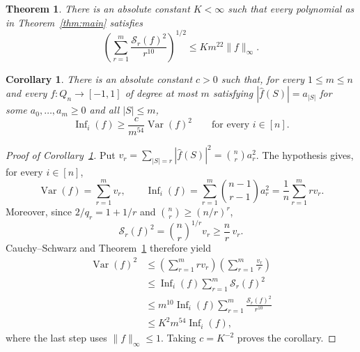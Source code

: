\documentclass[10pt,a4paper]{amsart}
\newtheorem{theorem}{Theorem}
\newtheorem{corollary}{Corollary}
\begin{document}
\begin{theorem}\label{thm:weighted}
There is an absolute constant $K<\infty$ such that every polynomial as in
Theorem~\ref{thm:main} satisfies
\begin{equation}\label{eq:weighted-intro}
\left(\sum_{r=1}^m\frac{\mathcal{S}_{r}(f)^2}{r^{10}}\right)^{1/2}
\le Km^{22}\|f\|_\infty.
\end{equation}
\end{theorem}

\begin{corollary}\label{cor:AA}
There is an absolute constant $c>0$ such that, for every $1\le m\le n$
and every $f:Q_n\to[-1,1]$ of degree at most $m$ satisfying
$|\widehat f(S)|=a_{|S|}$ for some $a_0,\ldots,a_m\ge0$ and all $|S|\le m$,
\[
\operatorname{Inf}_i(f)\ge
\frac{c}{m^{54}}\operatorname{Var}(f)^2
\qquad\text{for every }i\in[n].
\]
\end{corollary}

\begin{proof}[Proof of Corollary~\ref{cor:AA}]
Put $v_r=\sum_{|S|=r}|\widehat f(S)|^2=\binom nr a_r^2$. The hypothesis
gives, for every $i\in[n]$,
\[
\operatorname{Var}(f)=\sum_{r=1}^m v_r,
\qquad
\operatorname{Inf}_i(f)=\sum_{r=1}^m\binom{n-1}{r-1}a_r^2
=\frac1n\sum_{r=1}^m rv_r.
\]
Moreover, since $2/q_r=1+1/r$ and $\binom nr\ge(n/r)^r$,
\[
\mathcal{S}_r(f)^2=\binom nr^{1/r}v_r\ge\frac nr\,v_r.
\]
Cauchy--Schwarz and Theorem~\ref{thm:weighted} therefore yield
\begin{align*}
\operatorname{Var}(f)^2
&\le\left(\sum_{r=1}^m rv_r\right)
       \left(\sum_{r=1}^m\frac{v_r}{r}\right)\\
&\le\operatorname{Inf}_i(f)\sum_{r=1}^m\mathcal{S}_r(f)^2\\
&\le m^{10}\operatorname{Inf}_i(f)
       \sum_{r=1}^m\frac{\mathcal{S}_r(f)^2}{r^{10}}\\
&\le K^2m^{54}\operatorname{Inf}_i(f),
\end{align*}
where the last step uses $\|f\|_\infty\le1$.
Taking $c=K^{-2}$ proves the corollary.
\end{proof}
\end{document}
